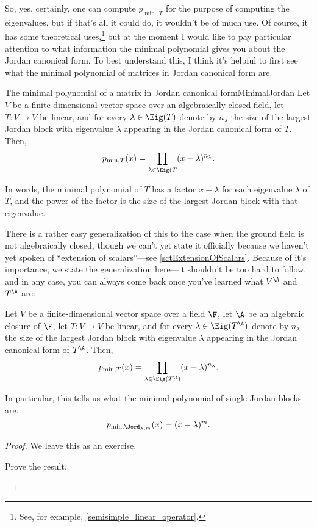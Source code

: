 So, yes, certainly, one can compute $p_{\min ,T}$ for the purpose of computing the eigenvalues, but if that's all it could do, it wouldn't be of much use.  Of course, it has some theoretical uses,\footnote{See, for example, \cref{semisimple_linear_operator}.} but at the moment I would like to pay particular attention to what information the minimal polynomial gives you about the Jordan canonical form.  To best understand this, I think it's helpful to first see what the minimal polynomial of matrices in Jordan canonical form are.
\begin{prp}{The minimal polynomial of a matrix in Jordan canonical form}{MinimalJordan}
	Let $V$ be a finite-dimensional vector space over an algebraically closed field, let $T\colon V\rightarrow V$ be linear, and for every $\lambda \in \Eig (T)$ denote by $n_{\lambda}$ the size of the largest Jordan block with eigenvalue $\lambda$ appearing in the Jordan canonical form of $T$.  Then,
	\begin{equation}
		p_{\min ,T}(x)=\prod _{\lambda \in \Eig (T}(x-\lambda )^{n_{\lambda}}.
	\end{equation}
	\begin{rmk}
		In words, the minimal polynomial of $T$ has a factor $x-\lambda$ for each eigenvalue $\lambda$ of $T$, and the power of the factor is the size of the largest Jordan block with that eigenvalue.
	\end{rmk}
	\begin{rmk}
		There is a rather easy generalization of this to the case when the ground field is not algebraically closed, though we can't yet state it officially because we haven't yet spoken of ``extension of scalars''---see \cref{sctExtensionOfScalars}.  Because of it's importance, we state the generalization here---it shouldn't be too hard to follow, and in any case, you can always come back once you've learned what $V^{\A}$ and $T^{\A}$ are.
		
		Let $V$ be a finite-dimensional vector space over a field $\F$, let $\A$ be an algebraic closure of $\F$, let $T\colon V\rightarrow V$ be linear, and for every $\lambda \in \Eig (T^{\A})$ denote by $n_{\lambda}$ the size of the largest Jordan block with eigenvalue $\lambda$ appearing in the Jordan canonical form of $T^{\A}$.  Then,
		\begin{equation}
			p_{\min ,T}(x)=\prod _{\lambda \in \Eig (T^{\A})}(x-\lambda )^{n_{\lambda}}.
		\end{equation}
	\end{rmk}
	\begin{rmk}
		In particular, this tells us what the minimal polynomial of single Jordan blocks are.
		\begin{equation}
			p_{\min ,\Jord _{\lambda ,m}}(x)=(x-\lambda )^m.
		\end{equation}
	\end{rmk}
	\begin{proof}
		We leave this as an exercise.
		\begin{exr}[breakable=false]{}{}
			Prove the result.
		\end{exr}
	\end{proof}
\end{prp}
